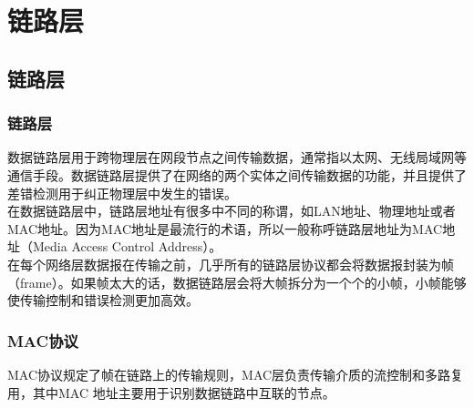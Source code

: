\chapter{链路层}

\section{链路层}

\subsection{链路层}

数据链路层用于跨物理层在网段节点之间传输数据，通常指以太网、无线局域网等通信手段。数据链路层提供了在网络的两个实体之间传输数据的功能，并且提供了差错检测用于纠正物理层中发生的错误。\\

在数据链路层中，链路层地址有很多中不同的称谓，如LAN地址、物理地址或者MAC地址。因为MAC地址是最流行的术语，所以一般称呼链路层地址为MAC地址（Media Access Control Address）。\\

在每个网络层数据报在传输之前，几乎所有的链路层协议都会将数据报封装为帧（frame）。如果帧太大的话，数据链路层会将大帧拆分为一个个的小帧，小帧能够使传输控制和错误检测更加高效。\\

\subsection{MAC协议}

MAC协议规定了帧在链路上的传输规则，MAC层负责传输介质的流控制和多路复用，其中MAC 地址主要用于识别数据链路中互联的节点。\\

